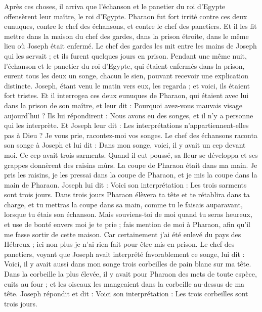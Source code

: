 \begin{multicols}{2}
\VerseOne{}Après ces choses, il arriva que l'échanson et le panetier du roi d'Egypte offensèrent leur maître, le roi d'Egypte.
Pharaon fut fort irrité contre ces deux eunuques, contre le chef des échansons, et contre le chef des panetiers.
Et il les fit mettre dans la maison du chef des gardes, dans la prison étroite, dans le même lieu où Joseph était enfermé.
Le chef des gardes les mit entre les mains de Joseph qui les servait ; et ils furent quelques jours en prison.
Pendant une même nuit, l’échanson et le panetier du roi d’Egypte, qui étaient enfermés dans la prison, eurent tous les deux un songe, chacun le sien, pouvant recevoir une explication distincte.
Joseph, étant venu le matin vers eux, les regarda ; et voici, ils étaient fort tristes.
Et il interrogea ces deux eunuques de Pharaon, qui étaient avec lui dans la prison de son maître, et leur dit : Pourquoi avez-vous mauvais visage aujourd'hui ?
Ils lui répondirent : Nous avons eu des songes, et il n'y a personne qui les interprète. Et Joseph leur dit : Les interprétations n’appartiennent-elles pas à Dieu ? Je vous prie, racontez-moi vos songes.
Le chef des échansons raconta son songe à Joseph et lui dit : Dans mon songe, voici, il y avait un cep devant moi.
Ce cep avait trois sarments. Quand il eut poussé, sa fleur se développa et ses grappes donnèrent des raisins mûrs.
La coupe de Pharaon était dans ma main. Je pris les raisins, je les pressai dans la coupe de Pharaon, et je mis la coupe dans la main de Pharaon.
Joseph lui dit : Voici son interprétation : Les trois sarments sont trois jours.
Dans trois jours Pharaon élèvera ta tête et te rétablira dans ta charge, et tu mettras la coupe dans sa main, comme tu le faisais auparavant, lorsque tu étais son échanson.
Mais souviens-toi de moi quand tu  seras heureux, et use de bonté envers moi je te prie ; fais mention de moi à Pharaon, afin  qu’il me fasse sortir de cette maison.
Car certainement j'ai été enlevé du pays des Hébreux ; ici non plus je n’ai rien fait  pour  être mis en prison.
Le chef des panetiers, voyant que Joseph avait interprété favorablement ce songe, lui dit : Voici, il y avait aussi dans mon songe trois corbeilles de pain blanc sur ma tête.
Dans la corbeille la plus élevée, il y avait pour Pharaon des mets de toute espèce, cuits au four ; et les oiseaux les mangeaient dans la corbeille au-dessus de ma tête.
Joseph répondit et dit : Voici son interprétation : Les trois corbeilles sont trois jours.

\end{multicols}
